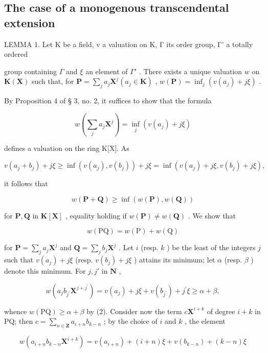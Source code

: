 \subsection{The case of a monogenous transcendental extension}

LEMMA 1. Let K be a field, v a valuation on K, Γ its order group, Γ' a totally ordered

group containing \(\Gamma\) and \(\xi\) an element of \(\Gamma'\) . There exists a unique valuation \(w\) on \(\mathbf{K}(\mathbf{X})\) such that, for \(\mathbf{P} = \sum_{j} a_j \mathbf{X}^j (a_j \in \mathbf{K})\) , \(w(\mathbf{P}) = \inf_j(v(a_j) + j\xi)\) .

By Proposition 4 of § 3, no. 2, it suffices to show that the formula

\[
w \left(\sum_ {j} a _ {j} \mathbf {X} ^ {j}\right) = \inf _ {j} (v (a _ {j}) + j \xi)\tag{1}
\]

defines a valuation on the ring K{[}X{]}. As

\[
v \left(a _ {j} + b _ {j}\right) + j \xi \geqslant \inf (v \left(a _ {j}\right), v \left(b _ {j}\right)) + j \xi = \inf (v \left(a _ {j}\right) + j \xi , v \left(b _ {j}\right) + j \xi),
\]

it follows that

\[
w (\mathbf {P} + \mathbf {Q}) \geqslant \inf (w (\mathbf {P}), w (\mathbf {Q}))\tag{2}
\]

for \(\mathbf{P},\mathbf{Q}\) in \(\mathbf{K}[\mathbf{X}]\) , equality holding if \(w(\mathbf{P})\neq w(\mathbf{Q})\) . We show that

\[
w (\mathrm{PQ}) = w (\mathrm{P}) + w (\mathrm{Q})\tag{3}
\]

for \(\mathbf{P} = \sum_{j} a_{j} \mathbf{X}^{j}\) and \(\mathbf{Q} = \sum_{j} b_{j} \mathbf{X}^{j}\) . Let \(i\) (resp. \(k\) ) be the least of the integers \(j\) such that \(v(a_{j}) + j\xi\) (resp. \(v(b_{j}) + j\xi\) ) attains its minimum; let \(\alpha\) (resp. \(\beta\) ) denote this minimum. For \(j, j'\) in \(\mathbf{N}\) ,

\[
w (a _ {j} b _ {j ^ {\prime}} \mathbf {X} ^ {j + j ^ {\prime}}) = v (a _ {j}) + j \xi + v (b _ {j ^ {\prime}}) + j ^ {\prime} \xi \geqslant \alpha + \beta ,
\]

whence \(w(\mathrm{PQ}) \geqslant \alpha + \beta\) by (2). Consider now the term \(c\mathbf{X}^{i + k}\) of degree \(i + k\) in PQ; then \(c = \sum_{n \in \mathbf{Z}} a_{i + n} b_{k - n}\) ; by the choice of \(i\) and \(k\) , the element

\[
w (a _ {i + n} b _ {k - n} \mathbf {X} ^ {i + k}) = v (a _ {i + n}) + (i + n) \xi + v (b _ {k - n}) + (k - n) \xi
\]


